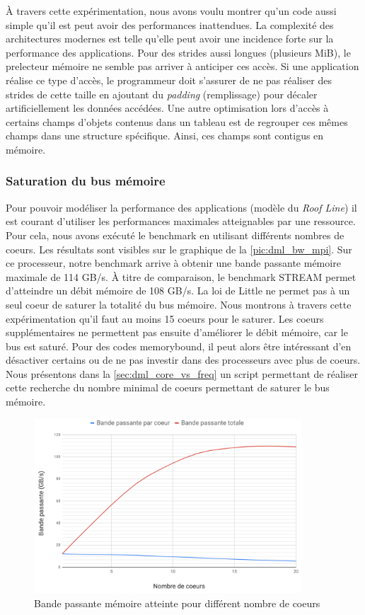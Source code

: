         À travers cette expérimentation, nous avons voulu montrer qu'un code aussi simple qu'il est peut avoir des performances inattendues. La complexité des architectures modernes est telle qu'elle peut avoir une incidence forte sur la performance des applications. Pour des strides aussi longues (plusieurs MiB), le \gls{prelecteur} mémoire ne semble pas arriver à anticiper ces accès. Si une application réalise ce type d'accès, le programmeur doit s'assurer de ne pas réaliser des strides de cette taille en ajoutant du \textit{padding} (remplissage) pour décaler artificiellement les données accédées. Une autre optimisation lors d'accès à certains champs d'objets contenus dans un tableau est de regrouper ces mêmes champs dans une structure spécifique. Ainsi, ces champs sont contigus en mémoire. 
        

    \subsubsection{Saturation du bus mémoire}\label{sec:dml_saturation}
        Pour pouvoir modéliser la performance des applications (modèle du \textit{Roof Line}) il est courant d'utiliser les performances maximales atteignables par une ressource. Pour cela, nous avons exécuté le benchmark en utilisant différents nombres de coeurs. Les résultats sont visibles sur le graphique de la \autoref{pic:dml_bw_mpi}. Sur ce processeur, notre benchmark arrive à obtenir une bande passante mémoire maximale de 114 GB/s. À titre de comparaison, le benchmark STREAM permet d'atteindre un débit mémoire de 108 GB/s. La loi de Little ne permet pas à un seul coeur de saturer la totalité du bus mémoire. Nous montrons à travers cette expérimentation qu'il faut au moins 15 coeurs pour le saturer. Les coeurs supplémentaires ne permettent pas ensuite d'améliorer le débit mémoire, car le bus est saturé. Pour des codes \gls{memorybound}, il peut alors être intéressant d'en désactiver certains ou de ne pas investir dans des processeurs avec plus de coeurs. Nous présentons dans la \autoref{sec:dml_core_vs_freq} un script permettant de réaliser cette recherche du nombre minimal de coeurs permettant de saturer le bus mémoire. 
        
        \begin{figure}
        \center
        \includegraphics[width=10cm]{images/dml_bw_mpi.png}
        \caption{\label{pic:dml_bw_mpi} Bande passante mémoire atteinte pour différent nombre de coeurs}
        \end{figure}
        
